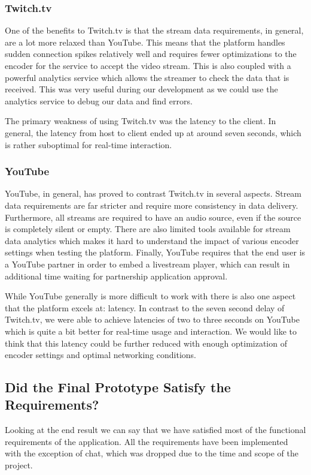 \subsubsection{Twitch.tv}
One of the benefits to Twitch.tv is that the stream data requirements, in general, are a lot more relaxed than YouTube. This means that the platform handles sudden connection spikes relatively well and requires fewer optimizations to the encoder for the service to accept the video stream. This is also coupled with a powerful analytics service which allows the streamer to check the data that is received. This was very useful during our development as we could use the analytics service to debug our data and find errors.

The primary weakness of using Twitch.tv was the latency to the client. In general, the latency from host to client ended up at around seven seconds, which is rather suboptimal for real-time interaction. 

\subsubsection{YouTube}
YouTube, in general, has proved to contrast Twitch.tv in several aspects. Stream data requirements are far stricter and require more consistency in data delivery. Furthermore, all streams are required to have an audio source, even if the source is completely silent or empty. There are also limited tools available for stream data analytics which makes it hard to understand the impact of various encoder settings when testing the platform. Finally, YouTube requires that the end user is a YouTube partner in order to embed a livestream player, which can result in additional time waiting for partnership application approval. 

While YouTube generally is more difficult to work with there is also one aspect that the platform excels at: latency. In contrast to the seven second delay of Twitch.tv, we were able to achieve latencies of two to three seconds on YouTube which is quite a bit better for real-time usage and interaction. We would like to think that this latency could be further reduced with enough optimization of encoder settings and optimal networking conditions.

\subsection{Did the Final Prototype Satisfy the Requirements?}
Looking at the end result we can say that we have satisfied most of the functional requirements of the application. All the requirements have been implemented with the exception of chat, which was dropped due to the time and scope of the project. 

